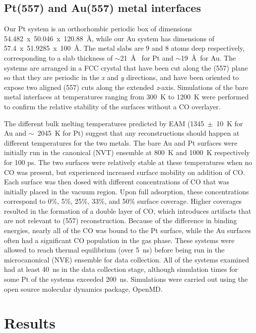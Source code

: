 \subsection{Pt(557) and Au(557) metal interfaces}
Our Pt system is an orthorhombic periodic box of dimensions
54.482~x~50.046~x~120.88~\AA, while our Au system has 
dimensions of 57.4~x~51.9285~x~100~\AA. The metal slabs 
are 9 and 8 atoms deep respectively, corresponding to a slab 
thickness of $\sim$21~\AA~ for Pt and $\sim$19~\AA~for Au.
The systems are arranged in a FCC crystal that have been cut
along the (557) plane so that they are periodic in the {\it x} and
{\it y} directions, and have been oriented to expose two aligned
(557) cuts along the extended {\it z}-axis.  Simulations of the 
bare metal interfaces at temperatures ranging from 300~K to
1200~K were performed to confirm the relative
stability of the surfaces without a CO overlayer.  

The different bulk melting temperatures predicted by EAM
(1345~$\pm$~10~K for Au\citep{Ahmed:2003lk} and $\sim$~2045~K for
Pt\citep{Bhattacharya:2011bq}) suggest that any reconstructions should happen at
different temperatures for the two metals.  The bare Au and Pt
surfaces were initially run in the canonical (NVT) ensemble at 800~K
and 1000~K respectively for 100 ps. The two surfaces were relatively
stable at these temperatures when no CO was present, but experienced
increased surface mobility on addition of CO. Each surface was then
dosed with different concentrations of CO that was initially placed in
the vacuum region.  Upon full adsorption, these concentrations
correspond to 0\%, 5\%, 25\%, 33\%, and 50\% surface coverage. Higher
coverages resulted in the formation of a double layer of CO, which
introduces artifacts that are not relevant to (557) reconstruction.
Because of the difference in binding energies, nearly all of the CO
was bound to the Pt surface, while the Au surfaces often had a
significant CO population in the gas phase.  These systems were
allowed to reach thermal equilibrium (over 5~ns) before being run in
the microcanonical (NVE) ensemble for data collection. All of the
systems examined had at least 40~ns in the data collection stage,
although simulation times for some Pt of the systems exceeded 200~ns.
Simulations were carried out using the open source molecular dynamics
package, OpenMD.\citep{Fennell:2006xq, Meineke:2005pt, openmd}


%
\section{Results}
